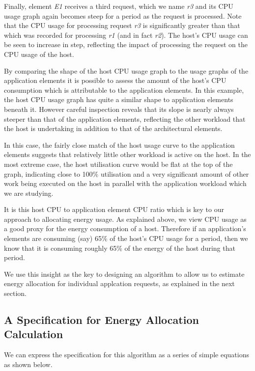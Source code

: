 Finally, element \emph{E1} receives a third request, which we name \emph{r3} and its CPU usage graph again becomes steep for a period as the request is processed.  Note that the CPU usage for processing request \emph{r3} is significantly greater than that which was recorded for processing \emph{r1} (and in fact \emph{r2}).  The host's CPU usage can be seen to increase in step, reflecting the impact of processing the request on the CPU usage of the host.

By comparing the shape of the host CPU usage graph to the usage graphs of the application elements it is possible to assess the amount of the host's CPU consumption which is attributable to the application elements.  In this example, the host CPU usage graph has quite a similar shape to application elements beneath it.  However careful inspection reveals that its slope is nearly always steeper than that of the application elements, reflecting the other workload that the host is undertaking in addition to that of the architectural elements.  

In this case, the fairly close match of the host usage curve to the application elements suggests that relatively little other workload is active on the host.  In the most extreme case, the host utilisation curve would be flat at the top of the graph, indicating close to 100\% utilisation and a very significant amount of other work being executed on the host in parallel with the application workload which we are studying.

It is this host CPU to application element CPU ratio which is key to our approach to allocating energy usage.  As explained above, we view CPU usage as a good proxy for the energy consumption of a host.  Therefore if an application's elements are consuming (say) 65\% of the host's CPU usage for a period, then we know that it is consuming roughly 65\% of the energy of the host during that period.

We use this insight as the key to designing an algorithm to allow us to estimate energy allocation for individual applcation requests, as explained in the next section.


\subsection{A Specification for Energy Allocation Calculation}
\label{subsection:calculation-specification}


We can express the specification for this algorithm as a series of simple equations as shown below.

